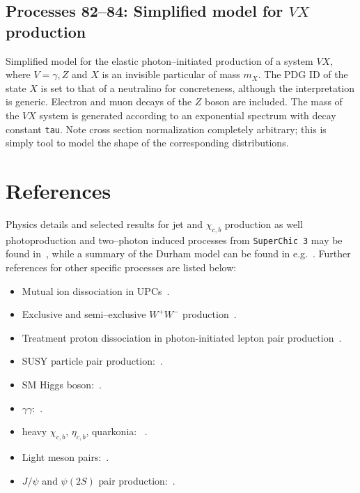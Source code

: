 \documentclass[12pt]{article}
\begin{document}
\subsection{Processes 82--84: Simplified model for $VX$ production}

Simplified model for the elastic photon--initiated production of a system $VX$, where $V=\gamma,Z$ and $X$ is an invisible particular of mass $m_X$. The PDG 
ID of the state $X$ is set to that of a neutralino for concreteness, although the interpretation is generic. Electron and muon decays of the $Z$ boson are 
included. The mass of the $VX$ system is generated according to an exponential spectrum with decay constant \texttt{tau}. Note cross section normalization 
completely arbitrary; this is simply tool to model the shape of the corresponding distributions.

\section{References}\label{sec:ref}



Physics details and selected results for jet and $\chi_{c,b}$ production as well photoproduction and two--photon induced processes from \texttt{SuperChic 3} 
may be found in~\cite{Harland-Lang:2015cta}, while a summary of the Durham model can be found in e.g.~\cite{Harland-Lang:2014dta,Harland-Lang:2014lxa,Harland-Lang:2015eqa}. 
Further references for other specific processes are listed below:
\begin{itemize}
\item Mutual ion dissociation in UPCs~\cite{Harland-Langiondiss}.
\item Exclusive and semi--exclusive $W^+ W^-$ production~\cite{Bailey:2022wqy}.
\item Treatment proton dissociation in photon-initiated lepton pair production~\cite{Harland-Lang:2020veo}.
\item SUSY particle pair production:~\cite{Harland-Lang:2018hmi}.
\item SM Higgs boson:~\cite{HarlandLang:2013jf}.
\item $\gamma\gamma$:~\cite{HarlandLang:2010ep,HarlandLang:2012qz}.
\item heavy $\chi_{c,b}$, $\eta_{c,b}$, quarkonia: ~\cite{HarlandLang:2009qe,HarlandLang:2010ep,HarlandLang:2010ys}. 
\item Light meson pairs:~\cite{HarlandLang:2011qd,Harland-Lang:2013ncy,Harland-Lang:2013qia}.
\item $J/\psi$ and $\psi(2S)$ pair production:~\cite{Harland-Lang:2014efa}.
\end{itemize}
\end{document}
